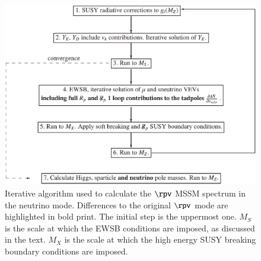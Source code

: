 \documentclass[pdflatex,final,3p,times]{elsarticle}
\begin{document}
\begin{figure}
\begin{center}
\includegraphics[width=350pt]{neutalg.eps}
\end{center}
\caption{Iterative algorithm used to calculate the $\rpv$ MSSM spectrum 
in the neutrino mode. Differences to the original $\rpv$ mode are highlighted in bold print.
The initial step is the
uppermost one. $M_S$ is the scale at which the EWSB
conditions 
are imposed, as discussed in the text. $M_X$ is the scale at which the high
energy SUSY breaking boundary conditions are imposed.
\label{fig:algorithm}}
\end{figure}
\end{document}
